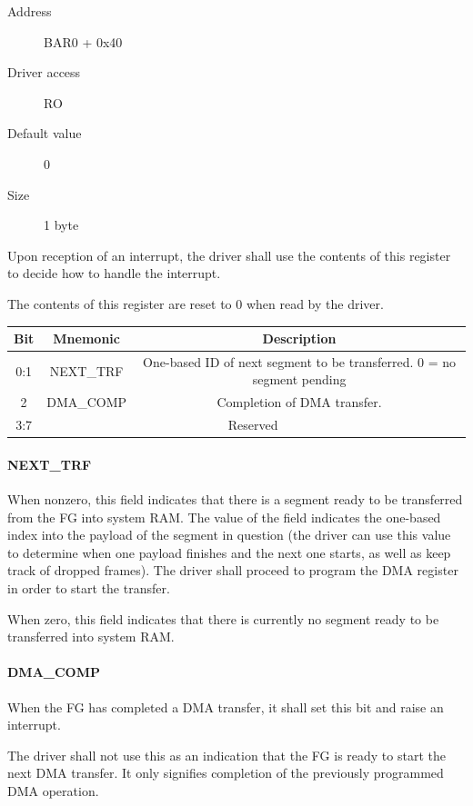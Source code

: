 \documentclass[12pt]{article}
\begin{document}
\begin{description}
\item[Address] BAR0 + 0x40
\item[Driver access] RO
\item[Default value] 0
\item[Size] 1 byte
\end{description}

Upon reception of an interrupt, the driver shall use the contents of this register to decide how to handle the interrupt.

The contents of this register are reset to 0 when read by the driver.

\begin{tabular}{|c|c|c|} \hline
\textbf{Bit} & \textbf{Mnemonic} & \textbf{Description} \\ \hline
0:1 & NEXT\_TRF & One-based ID of next segment to be transferred. 0 = no segment pending \\ \hline
2 & DMA\_COMP & Completion of DMA transfer. \\ \hline
3:7 & \multicolumn{2}{|c|}{Reserved} \\ \hline
\end{tabular}

\paragraph{NEXT\_TRF}

When nonzero, this field indicates that there is a segment ready to be transferred from the FG into system RAM. The value of the field indicates the one-based index into the payload of the segment in question (the driver can use this value to determine when one payload finishes and the next one starts, as well as keep track of dropped frames). The driver shall proceed to program the DMA register in order to start the transfer.

When zero, this field indicates that there is currently no segment ready to be transferred into system RAM.

\paragraph{DMA\_COMP}

When the FG has completed a DMA transfer, it shall set this bit and raise an interrupt.

The driver shall not use this as an indication that the FG is ready to start the next DMA transfer. It only signifies completion of the previously programmed DMA operation.
\end{document}
